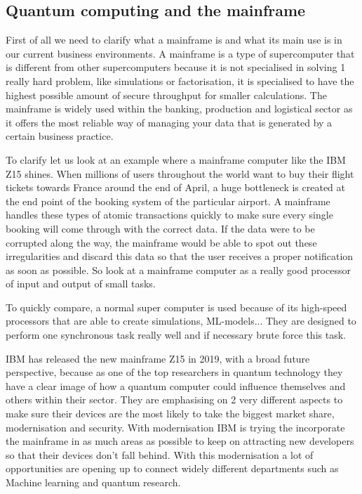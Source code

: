 \subsection{Quantum computing and the mainframe}

First of all we need to clarify what a mainframe is and what its main use is in our current business environments. A mainframe is a type of supercomputer that is different from other supercomputers because it is not specialised in solving 1 really hard problem, like simulations or factorisation, it is specialised to have the highest possible amount of secure throughput for smaller calculations. The mainframe is widely used within the banking, production and logistical sector as it offers the most reliable way of managing your data that is generated by a certain business practice.

To clarify let us look at an example where a mainframe computer like the IBM Z15 shines. When millions of users throughout the world want to buy their flight tickets towards France around the end of April, a huge bottleneck is created at the end point of the booking system of the particular airport. A mainframe handles these types of atomic transactions quickly to make sure every single booking will come through with the correct data. If the data were to be corrupted along the way, the mainframe would be able to spot out these irregularities and discard this data so that the user receives a proper notification as soon as possible. So look at a mainframe computer as a really good processor of input and output of small tasks.

To quickly compare, a normal super computer is used because of its high-speed processors that are able to create simulations, ML-models... They are designed to perform one synchronous task really well and if necessary brute force this task.

IBM has released the new mainframe Z15 in 2019, with a broad future perspective, because as one of the top researchers in quantum technology they have a clear image of how a quantum computer could influence themselves and others within their sector.
They are emphasising on 2 very different aspects to make sure their devices are the most likely to take the biggest market share, modernisation and security. 
With modernisation IBM is trying the incorporate the mainframe in as much areas as possible to keep on attracting new developers so that their devices don't fall behind. With this modernisation a lot of opportunities are opening up to connect widely different departments such as Machine learning and quantum research.

